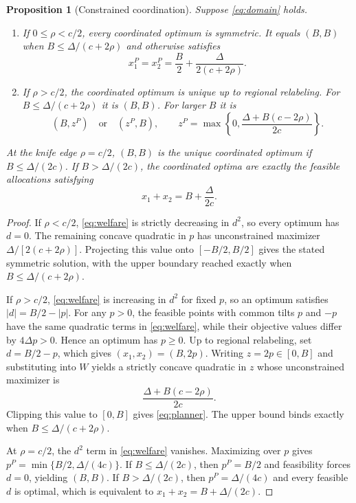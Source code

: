 \documentclass[12pt]{article}
\newtheorem{proposition}{Proposition}
\begin{document}
\begin{proposition}[Constrained coordination]
Suppose \eqref{eq:domain} holds.
\begin{enumerate}
\item If $0\le\rho<c/2$, every coordinated optimum is symmetric. It equals $(B,B)$ when $B\le \Delta/(c+2\rho)$ and otherwise satisfies
\[
x_1^P=x_2^P=\frac{B}{2}+\frac{\Delta}{2(c+2\rho)}.
\]
\item If $\rho>c/2$, the coordinated optimum is unique up to regional relabeling. For $B\le \Delta/(c+2\rho)$ it is $(B,B)$. For larger $B$ it is
\begin{equation}
(B,z^P)\quad\text{or}\quad(z^P,B),
\qquad
z^P=\max\left\{0,\frac{\Delta+B(c-2\rho)}{2c}\right\}.
\label{eq:planner}
\end{equation}
\end{enumerate}
At the knife edge $\rho=c/2$, $(B,B)$ is the unique coordinated optimum if $B\le\Delta/(2c)$. If $B>\Delta/(2c)$, the coordinated optima are exactly the feasible allocations satisfying
\[
x_1+x_2=B+\frac{\Delta}{2c}.
\]
\end{proposition}

\begin{proof}
If $\rho<c/2$, \eqref{eq:welfare} is strictly decreasing in $d^2$, so every optimum has $d=0$. The remaining concave quadratic in $p$ has unconstrained maximizer $\Delta/[2(c+2\rho)]$. Projecting this value onto $[-B/2,B/2]$ gives the stated symmetric solution, with the upper boundary reached exactly when $B\le\Delta/(c+2\rho)$.

If $\rho>c/2$, \eqref{eq:welfare} is increasing in $d^2$ for fixed $p$, so an optimum satisfies $|d|=B/2-|p|$. For any $p>0$, the feasible points with common tilts $p$ and $-p$ have the same quadratic terms in \eqref{eq:welfare}, while their objective values differ by $4\Delta p>0$. Hence an optimum has $p\ge0$. Up to regional relabeling, set $d=B/2-p$, which gives $(x_1,x_2)=(B,2p)$. Writing $z=2p\in[0,B]$ and substituting into $W$ yields a strictly concave quadratic in $z$ whose unconstrained maximizer is
\[
\frac{\Delta+B(c-2\rho)}{2c}.
\]
Clipping this value to $[0,B]$ gives \eqref{eq:planner}. The upper bound binds exactly when $B\le\Delta/(c+2\rho)$.

At $\rho=c/2$, the $d^2$ term in \eqref{eq:welfare} vanishes. Maximizing over $p$ gives $p^P=\min\{B/2,\Delta/(4c)\}$. If $B\le\Delta/(2c)$, then $p^P=B/2$ and feasibility forces $d=0$, yielding $(B,B)$. If $B>\Delta/(2c)$, then $p^P=\Delta/(4c)$ and every feasible $d$ is optimal, which is equivalent to $x_1+x_2=B+\Delta/(2c)$.
\end{proof}
\end{document}
